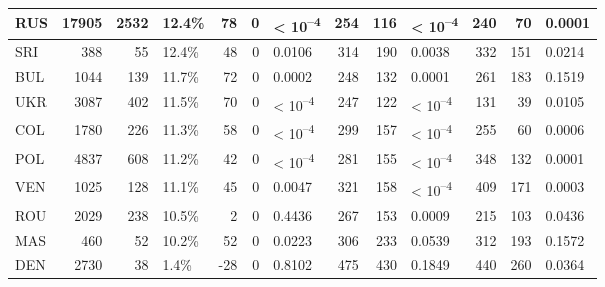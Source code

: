 \begin{tabular}{l|r|r|l|r|r|l|r|r|l|r|r|l}
\hline
RUS & 17905 & 2532 & 12.4\% & 78 & 0 & < 10\textsuperscript{--4} & 254 & 116 & < 10\textsuperscript{--4} & 240 & 70 & 0.0001\\
\hline
SRI & 388 & 55 & 12.4\% & 48 & 0 & 0.0106 & 314 & 190 & 0.0038 & 332 & 151 & 0.0214\\
\hline
BUL & 1044 & 139 & 11.7\% & 72 & 0 & 0.0002 & 248 & 132 & 0.0001 & 261 & 183 & 0.1519\\
\hline
UKR & 3087 & 402 & 11.5\% & 70 & 0 & < 10\textsuperscript{--4} & 247 & 122 & < 10\textsuperscript{--4} & 131 & 39 & 0.0105\\
\hline
COL & 1780 & 226 & 11.3\% & 58 & 0 & < 10\textsuperscript{--4} & 299 & 157 & < 10\textsuperscript{--4} & 255 & 60 & 0.0006\\
\hline
POL & 4837 & 608 & 11.2\% & 42 & 0 & < 10\textsuperscript{--4} & 281 & 155 & < 10\textsuperscript{--4} & 348 & 132 & 0.0001\\
\hline
VEN & 1025 & 128 & 11.1\% & 45 & 0 & 0.0047 & 321 & 158 & < 10\textsuperscript{--4} & 409 & 171 & 0.0003\\
\hline
ROU & 2029 & 238 & 10.5\% & 2 & 0 & 0.4436 & 267 & 153 & 0.0009 & 215 & 103 & 0.0436\\
\hline
MAS & 460 & 52 & 10.2\% & 52 & 0 & 0.0223 & 306 & 233 & 0.0539 & 312 & 193 & 0.1572\\
\hline
DEN & 2730 & 38 & 1.4\% & -28 & 0 & 0.8102 & 475 & 430 & 0.1849 & 440 & 260 & 0.0364\\
\hline
\end{tabular}
